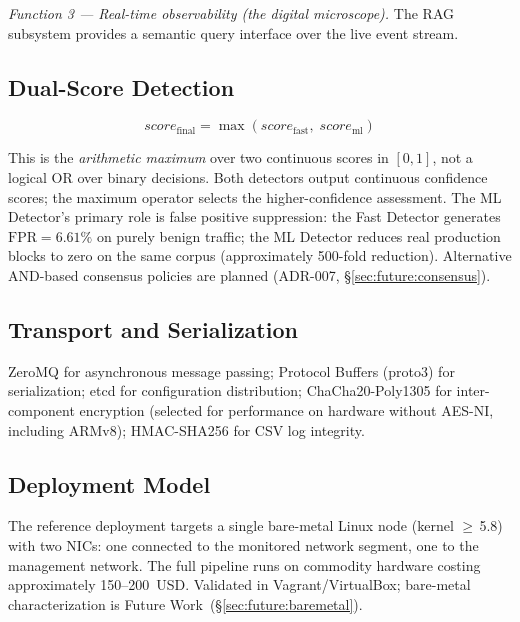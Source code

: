 \documentclass[11pt,a4paper]{article}
\begin{document}
    \emph{Function 3 --- Real-time observability (the digital microscope).}
    The RAG subsystem provides a semantic query interface over the live event stream.

    \subsection{Dual-Score Detection}

    \begin{equation}
        score_{\text{final}} = \max\!\left(score_{\text{fast}},\; score_{\text{ml}}\right)
        \label{eq:dualscore}
    \end{equation}

    This is the \emph{arithmetic maximum} over two continuous scores in $[0,1]$, not a logical
    OR over binary decisions. Both detectors output continuous confidence scores; the maximum
    operator selects the higher-confidence assessment. The ML Detector's primary role is false
    positive suppression: the Fast Detector generates $\text{FPR} = 6.61\%$ on purely benign
    traffic; the ML Detector reduces real production blocks to zero on the same corpus
    (approximately 500-fold reduction). Alternative AND-based consensus policies are planned
    (ADR-007, \S\ref{sec:future:consensus}).

    \subsection{Transport and Serialization}

    ZeroMQ for asynchronous message passing; Protocol Buffers (proto3) for serialization; etcd
    for configuration distribution; ChaCha20-Poly1305 for inter-component encryption (selected
    for performance on hardware without AES-NI, including ARMv8); HMAC-SHA256 for CSV log
    integrity.

    \subsection{Deployment Model}
    \label{sec:deployment}

    The reference deployment targets a single bare-metal Linux node (kernel $\geq$\,5.8) with
    two NICs: one connected to the monitored network segment, one to the management network.
    The full pipeline runs on commodity hardware costing approximately 150--200~USD. Validated
    in Vagrant/VirtualBox; bare-metal characterization is Future Work~(\S\ref{sec:future:baremetal}).
\end{document}
